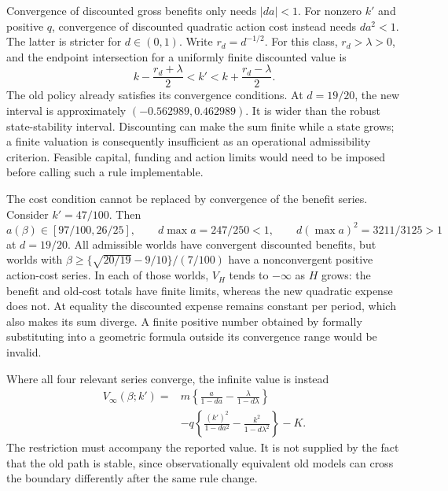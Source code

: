 Convergence of discounted gross benefits only needs $|da|<1$.
For nonzero $k'$ and positive $q$, convergence of discounted quadratic
action cost instead needs $da^2<1$. The latter is stricter for
$d\in(0,1)$. Write $r_d=d^{-1/2}$. For this class, $r_d>\lambda>0$,
and the endpoint intersection for a uniformly finite discounted value is
\begin{equation}
 k-\frac{r_d+\lambda}{2}<k'<
 k+\frac{r_d-\lambda}{2}.
 \label{exec17:s6-robust-cost}
\end{equation}
The old policy already satisfies its convergence conditions. At
$d=19/20$, the new interval is approximately
$(-0.562989,0.462989)$. It is wider than the robust state-stability
interval. Discounting can make the sum finite while a state grows;
a finite valuation is consequently insufficient as an operational
admissibility criterion. Feasible capital, funding and action limits would
need to be imposed before calling such a rule implementable.

The cost condition cannot be replaced by convergence of the benefit
series. Consider $k'=47/100$. Then
\begin{equation}
 a(\beta)\in[97/100,26/25],\qquad
 d\max a=247/250<1,\qquad
 d(\max a)^2=3211/3125>1
 \label{exec17:s6-rule-divergence}
\end{equation}
at $d=19/20$. All admissible worlds have convergent discounted benefits,
but worlds with
$\beta\geq\{\sqrt{20/19}-9/10\}/(7/100)$ have a nonconvergent
positive action-cost series. In each of those worlds, $V_H$ tends to
$-\infty$ as $H$ grows: the benefit and old-cost totals have finite
limits, whereas the new quadratic expense does not. At equality the
discounted expense remains constant per period, which also makes its
sum diverge. A finite positive number obtained by formally substituting
into a geometric formula outside its convergence range would be invalid.

Where all four relevant series converge, the infinite value is instead
\begin{equation}
 \begin{split}
 V_\infty(\beta;k')={}&m\left\{\frac{a}{1-da}
                       -\frac{\lambda}{1-d\lambda}\right\}\\
 &-q\left\{\frac{(k')^2}{1-da^2}
                       -\frac{k^2}{1-d\lambda^2}\right\}-K.
 \end{split}
 \label{exec17:s6-full-infinite}
\end{equation}
The restriction must accompany the reported value. It is not supplied by
the fact that the old path is stable, since observationally equivalent
old models can cross the boundary differently after the same rule change.

